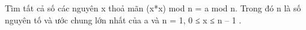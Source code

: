 Tìm tất cả số các nguyên x thoả mãn (x*x) mod n = a mod n. Trong đó n là số nguyên tố và ước chung lớn nhất của a và n = 1, 0 ≤ x ≤ n – 1 .  

\